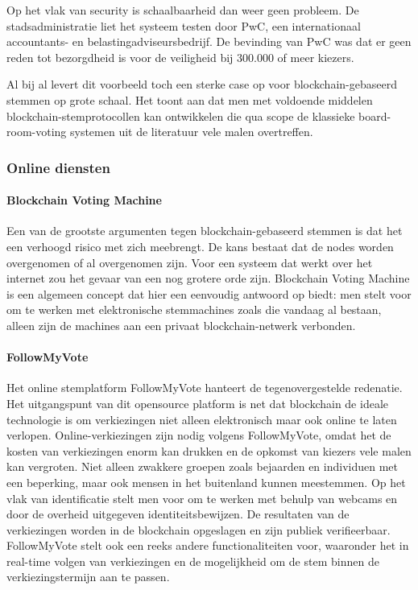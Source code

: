 				Op het vlak van security is schaalbaarheid dan weer geen probleem. De stadsadministratie liet het systeem testen door PwC, een internationaal accountants- en belastingadviseursbedrijf. De bevinding van PwC was dat er geen reden tot bezorgdheid is voor de veiligheid bij  300.000 of meer kiezers. 
				
				Al bij al levert dit voorbeeld toch een sterke case op voor blockchain-gebaseerd stemmen op grote schaal. Het toont aan dat men met voldoende middelen blockchain-stemprotocollen kan ontwikkelen die qua scope de klassieke board-room-voting systemen uit de literatuur vele malen overtreffen. 
			\subsubsection{Online diensten}
				\paragraph{Blockchain Voting Machine }
					Een van de grootste argumenten tegen blockchain-gebaseerd stemmen is dat het een verhoogd risico met zich meebrengt. De kans bestaat dat de nodes worden overgenomen of al overgenomen zijn. Voor een systeem dat werkt over het internet zou het gevaar van een nog grotere orde zijn. Blockchain Voting Machine is een algemeen concept dat hier een eenvoudig antwoord op biedt: men stelt voor om te werken met elektronische stemmachines zoals die vandaag al bestaan,  alleen zijn de machines aan een privaat blockchain-netwerk verbonden. 
				\paragraph{FollowMyVote}
					Het online stemplatform FollowMyVote hanteert de tegenovergestelde redenatie. Het uitgangspunt van dit opensource platform is net dat blockchain de ideale technologie is om verkiezingen niet alleen elektronisch maar ook online te laten verlopen. Online-verkiezingen zijn nodig volgens FollowMyVote, omdat het de kosten van verkiezingen enorm kan drukken en de opkomst van kiezers vele malen kan vergroten.  Niet alleen zwakkere groepen zoals bejaarden en individuen met een beperking, maar ook mensen in het buitenland kunnen meestemmen.  Op het vlak van identificatie stelt men voor om te werken met behulp van webcams en door de overheid uitgegeven identiteitsbewijzen. De resultaten van de verkiezingen worden in de blockchain opgeslagen en zijn publiek verifieerbaar. FollowMyVote stelt ook een reeks andere functionaliteiten voor, waaronder het in real-time volgen van verkiezingen en de mogelijkheid om de stem binnen de verkiezingstermijn aan te passen. 
